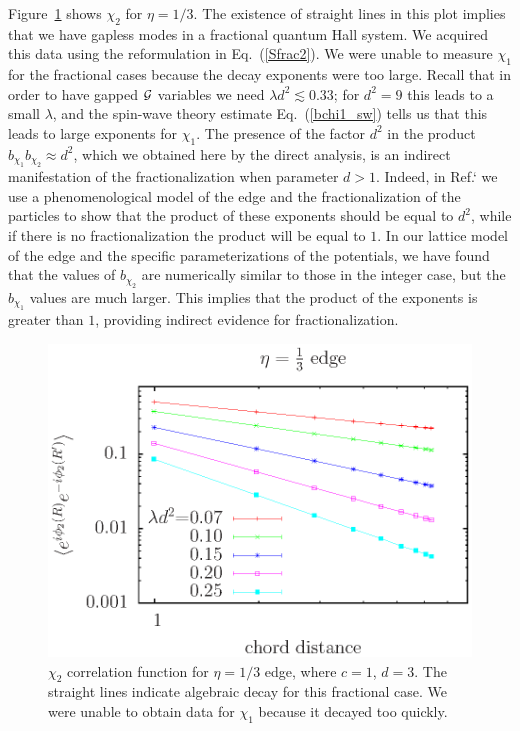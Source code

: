 Figure~\ref{onethird} shows $\chi_2$ for $\eta=1/3$. The existence of straight lines in this plot implies that we have gapless modes in a fractional quantum Hall system. We acquired this data using the reformulation in Eq.~(\ref{Sfrac2}). We were unable to measure $\chi_1$ for the fractional cases because the decay exponents were too large. Recall that in order to have gapped $\cal{G}$ variables we need $\lambda d^2 \lesssim 0.33$; for $d^2=9$ this leads to a small $\lambda$, and the spin-wave theory estimate Eq.~(\ref{bchi1_sw}) tells us that this leads to large exponents for $\chi_1$.  The presence of the factor $d^2$ in the product $b_{\chi_1} b_{\chi_2} \approx d^2$, which we obtained here by the direct analysis, is an indirect manifestation of the fractionalization when parameter $d>1$.  
Indeed, 
in Ref.`\cite{FQHE} we use a phenomenological model of the edge and the fractionalization of the particles to show that the product of these exponents should be equal to $d^2$, while if there is no fractionalization the product will be equal to $1$. In our lattice model of the edge and the specific parameterizations of the potentials, we have found that the values of $b_{\chi_2}$ are numerically similar to those in the integer case, but the $b_{\chi_1}$ values are much larger. This implies that the product of the exponents is greater than $1$, providing indirect evidence for fractionalization.

\begin{figure}
\includegraphics[width=0.6\linewidth]{figures/thirdcord.eps}
\caption{ $\chi_2$ correlation function for $\eta=1/3$ edge, where $c=1$, $d=3$. The straight lines indicate algebraic decay for this fractional case. We were unable to obtain data for $\chi_1$ because it decayed too quickly.
\label{onethird}}
\end{figure}


